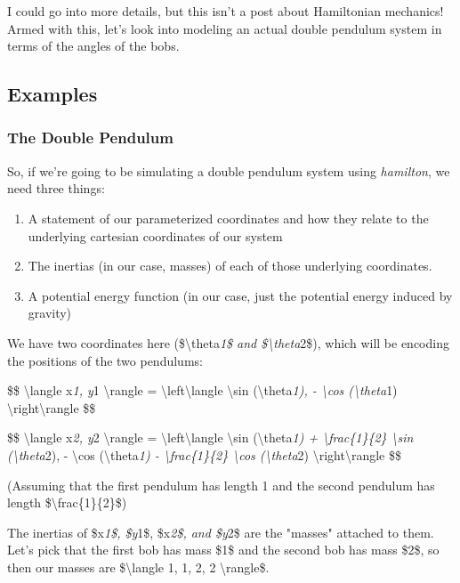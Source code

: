 \documentclass[]{article}
\begin{document}
I could go into more details, but this isn't a post about Hamiltonian mechanics!
Armed with this, let's look into modeling an actual double pendulum system in
terms of the angles of the bobs.

\subsection{Examples}

\subsubsection{The Double Pendulum}

So, if we're going to be simulating a double pendulum system using
\emph{hamilton}, we need three things:

\begin{enumerate}
\item
  A statement of our parameterized coordinates and how they relate to the
  underlying cartesian coordinates of our system
\item
  The inertias (in our case, masses) of each of those underlying coordinates.
\item
  A potential energy function (in our case, just the potential energy induced by
  gravity)
\end{enumerate}

We have two coordinates here (\$\textbackslash{}theta\emph{1\$ and
\$\textbackslash{}theta}2\$), which will be encoding the positions of the two
pendulums:

\$\$ \textbackslash{}langle x\emph{1, y}1 \textbackslash{}rangle =
\textbackslash{}left\textbackslash{}langle \textbackslash{}sin
(\textbackslash{}theta\emph{1), - \textbackslash{}cos (\textbackslash{}theta}1)
\textbackslash{}right\textbackslash{}rangle \$\$

\$\$ \textbackslash{}langle x\emph{2, y}2 \textbackslash{}rangle =
\textbackslash{}left\textbackslash{}langle \textbackslash{}sin
(\textbackslash{}theta\emph{1) + \textbackslash{}frac\{1\}\{2\}
\textbackslash{}sin (\textbackslash{}theta}2), - \textbackslash{}cos
(\textbackslash{}theta\emph{1) - \textbackslash{}frac\{1\}\{2\}
\textbackslash{}cos (\textbackslash{}theta}2)
\textbackslash{}right\textbackslash{}rangle \$\$

(Assuming that the first pendulum has length 1 and the second pendulum has
length \$\textbackslash{}frac\{1\}\{2\}\$)

The inertias of \$x\emph{1\$, \$y}1\$, \$x\emph{2\$, and \$y}2\$ are the
"masses" attached to them. Let's pick that the first bob has mass \$1\$ and the
second bob has mass \$2\$, so then our masses are \$\textbackslash{}langle 1, 1,
2, 2 \textbackslash{}rangle\$.
\end{document}
